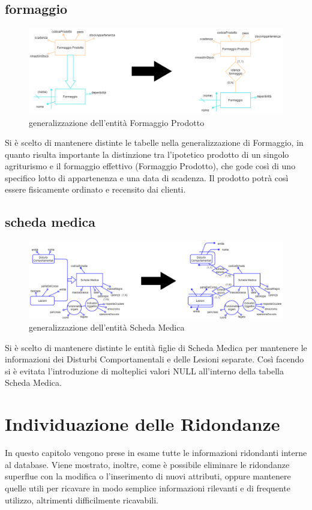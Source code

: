 \documentclass[12pt,a4paper]{article}
\begin{document}
\subsection{formaggio}
\begin{figure}[H]
\centering
\includegraphics[scale=2, width=1.15\textwidth]{ridondanze/formaggio.png}
\caption{ge\-ne\-ra\-liz\-za\-zio\-ne dell'entità Formaggio Prodotto}
\end{figure}
Si è scelto di mantenere distinte le tabelle nella ge\-ne\-ra\-liz\-za\-zio\-ne di Formaggio, in quanto risulta importante la distinzione tra l'ipotetico prodotto di un singolo agriturismo e il formaggio effettivo (Formaggio Prodotto), che gode così di uno specifico lotto di appartenenza e una data di scadenza. Il prodotto potrà così essere fisicamente ordinato e recensito dai clienti.
\subsection{scheda medica}
\begin{figure}[H]
\centering
\includegraphics[scale=2, width=1.15\textwidth]{ridondanze/scheda_medica.png}
\caption{ge\-ne\-ra\-liz\-za\-zio\-ne dell'entità Scheda Medica}
\end{figure}
Si è scelto di mantenere distinte le entità figlie di Scheda Medica per mantenere le informazioni dei Disturbi Comportamentali e delle Lesioni separate. Così facendo si è evitata l'introduzione di molteplici valori NULL all'interno della tabella Scheda Medica.
\section{Individuazione delle Ridondanze}
\label{sec:ridondanze}
In questo capitolo vengono prese in esame tutte le informazioni ridondanti interne al database. Viene mostrato, inoltre, come è possibile eliminare le ridondanze superflue con la modifica o l'inserimento di nuovi attributi, oppure mantenere quelle utili per ricavare in modo semplice informazioni rilevanti e di frequente utilizzo, altrimenti difficilmente ricavabili.
\end{document}

